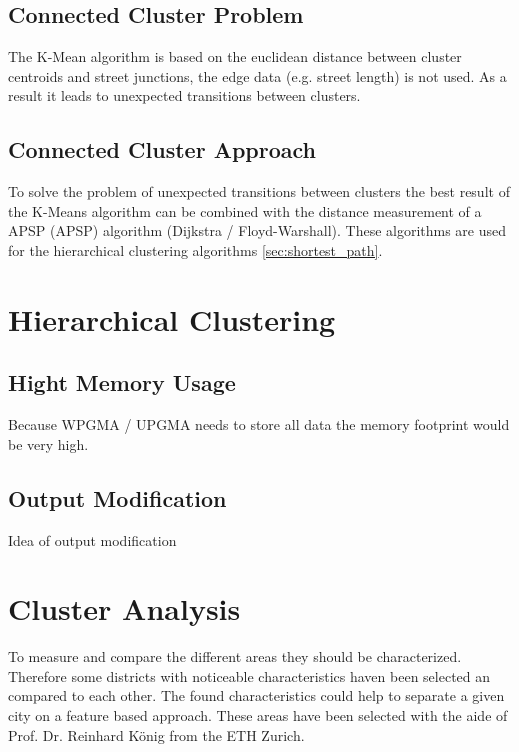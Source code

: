 \subsection{Connected Cluster Problem} \label{sec:kmenasProblem}
The K-Mean algorithm is based on the euclidean distance between cluster centroids and street junctions, the edge data (e.g. street length) is not used. As a result it leads to unexpected transitions between clusters.

\subsection{Connected Cluster Approach} \label{sec:connected_cluster_approach}
To solve the problem of unexpected transitions between clusters the best result of the K-Means algorithm can be combined with the distance measurement of a \acrlong{APSP} (\acrshort{APSP}) algorithm (Dijkstra / Floyd-Warshall). These algorithms are used for the hierarchical clustering algorithms \ref{sec:shortest_path}.

\pagebreak
\section{Hierarchical Clustering}

\subsection{Hight Memory Usage}
Because WPGMA / UPGMA needs to store all data the memory footprint would be very high. %

\subsection{Output Modification}
Idea of output modification

\pagebreak
\section{Cluster Analysis}
\label{sec:concept_cluster_analysis}
To measure and compare the different areas they should be characterized. Therefore some districts with noticeable characteristics haven been selected an compared to each other. The found characteristics could help to separate a given city on a feature based approach.
These areas have been selected with the aide of Prof. Dr. Reinhard König from the ETH Zurich.

